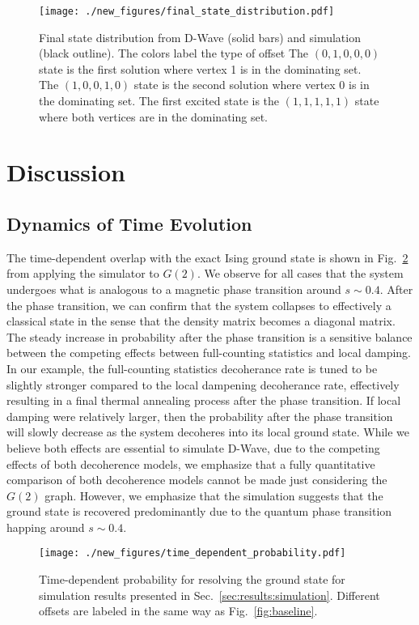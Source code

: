 \documentclass[prd,twocolumn,tightenlines,preprintnumbers,showpacs,superscriptaddress,notitlepage,nofootinbib,eqsecnum,floatfix,longbibliography,aps,10pt]{revtex4-2}
\begin{document}
\begin{figure}
	\centering
	\texttt{[image: ./new\_figures/final\_state\_distribution.pdf]}
	\caption{Final state distribution from D-Wave (solid bars) and simulation (black outline). The colors label the type of offset  The $(0, 1, 0, 0, 0)$ state is the first solution where vertex 1 is in the dominating set. The $(1, 0, 0, 1, 0)$ state is the second solution where vertex 0 is in the dominating set. The first excited state is the $(1, 1, 1, 1, 1)$ state where both vertices are in the dominating set.}
	\label{fig:final_state_distribution}
\end{figure}


\section{Discussion}
\subsection{Dynamics of Time Evolution}
\label{sec:discussion:time_evolution}

The time-dependent overlap with the exact Ising ground state is shown in Fig.~\ref{fig:td_prob} from applying the simulator to $G(2)$. We observe for all cases that the system undergoes what is analogous to a magnetic phase transition around $s\sim 0.4$.
After the phase transition, we can confirm that the system collapses to effectively a classical state in the sense that the density matrix becomes a diagonal matrix.
The steady increase in probability after the phase transition is a sensitive balance between the competing effects between full-counting statistics and local damping.
In our example, the full-counting statistics decoherance rate is tuned to be slightly stronger compared to the local dampening decoherance rate, effectively resulting in a final thermal annealing process after the phase transition.
If local damping were relatively larger, then the probability after the phase transition will slowly decrease as the system decoheres into its local ground state.
While we believe both effects are essential to simulate D-Wave, due to the competing effects of both decoherence models, we emphasize that a fully quantitative comparison of both decoherence models cannot be made just considering the $G(2)$ graph.
However, we emphasize that the simulation suggests that the ground state is recovered predominantly due to the quantum phase transition happing around $s\sim 0.4$.

\begin{figure}
	\centering
	\texttt{[image: ./new\_figures/time\_dependent\_probability.pdf]}
	\caption{Time-dependent probability for resolving the ground state for simulation results presented in Sec.~\ref{sec:results:simulation}. Different offsets are labeled in the same way as Fig.~\ref{fig:baseline}.}
	\label{fig:td_prob}
\end{figure}
\end{document}
